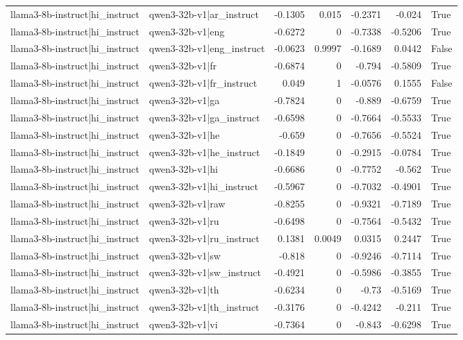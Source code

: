 \begin{table}
\begin{tabular}{l l r r r r l}
llama3-8b-instruct|hi_instruct & qwen3-32b-v1|ar_instruct & -0.1305 & 0.015 & -0.2371 & -0.024 & True \\
llama3-8b-instruct|hi_instruct & qwen3-32b-v1|eng & -0.6272 & 0 & -0.7338 & -0.5206 & True \\
llama3-8b-instruct|hi_instruct & qwen3-32b-v1|eng_instruct & -0.0623 & 0.9997 & -0.1689 & 0.0442 & False \\
llama3-8b-instruct|hi_instruct & qwen3-32b-v1|fr & -0.6874 & 0 & -0.794 & -0.5809 & True \\
llama3-8b-instruct|hi_instruct & qwen3-32b-v1|fr_instruct & 0.049 & 1 & -0.0576 & 0.1555 & False \\
llama3-8b-instruct|hi_instruct & qwen3-32b-v1|ga & -0.7824 & 0 & -0.889 & -0.6759 & True \\
llama3-8b-instruct|hi_instruct & qwen3-32b-v1|ga_instruct & -0.6598 & 0 & -0.7664 & -0.5533 & True \\
llama3-8b-instruct|hi_instruct & qwen3-32b-v1|he & -0.659 & 0 & -0.7656 & -0.5524 & True \\
llama3-8b-instruct|hi_instruct & qwen3-32b-v1|he_instruct & -0.1849 & 0 & -0.2915 & -0.0784 & True \\
llama3-8b-instruct|hi_instruct & qwen3-32b-v1|hi & -0.6686 & 0 & -0.7752 & -0.562 & True \\
llama3-8b-instruct|hi_instruct & qwen3-32b-v1|hi_instruct & -0.5967 & 0 & -0.7032 & -0.4901 & True \\
llama3-8b-instruct|hi_instruct & qwen3-32b-v1|raw & -0.8255 & 0 & -0.9321 & -0.7189 & True \\
llama3-8b-instruct|hi_instruct & qwen3-32b-v1|ru & -0.6498 & 0 & -0.7564 & -0.5432 & True \\
llama3-8b-instruct|hi_instruct & qwen3-32b-v1|ru_instruct & 0.1381 & 0.0049 & 0.0315 & 0.2447 & True \\
llama3-8b-instruct|hi_instruct & qwen3-32b-v1|sw & -0.818 & 0 & -0.9246 & -0.7114 & True \\
llama3-8b-instruct|hi_instruct & qwen3-32b-v1|sw_instruct & -0.4921 & 0 & -0.5986 & -0.3855 & True \\
llama3-8b-instruct|hi_instruct & qwen3-32b-v1|th & -0.6234 & 0 & -0.73 & -0.5169 & True \\
llama3-8b-instruct|hi_instruct & qwen3-32b-v1|th_instruct & -0.3176 & 0 & -0.4242 & -0.211 & True \\
llama3-8b-instruct|hi_instruct & qwen3-32b-v1|vi & -0.7364 & 0 & -0.843 & -0.6298 & True \\

\end{tabular}
\end{table}
